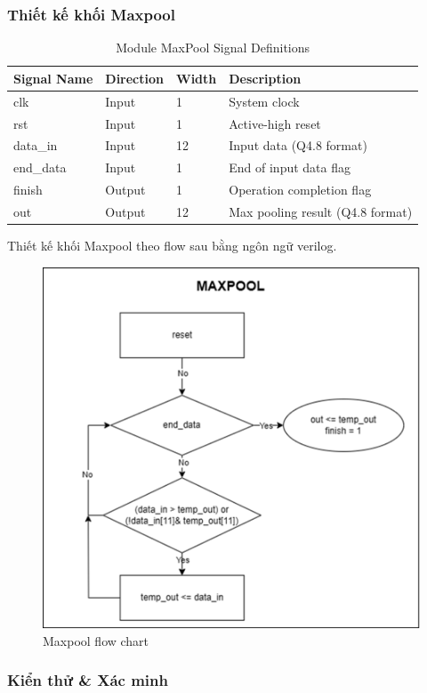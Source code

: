 \subsubsection{Thiết kế khối Maxpool}
\begin{table}[H]
\centering
\caption{Module MaxPool Signal Definitions}
\begin{tabular}{>{\ttfamily}l l l p{6cm}}
\toprule
\textbf{Signal Name} & \textbf{Direction} & \textbf{Width} & \textbf{Description} \\
\midrule
clk      & Input  & 1  & System clock \\
rst      & Input  & 1  & Active-high reset \\
data\_in & Input  & 12 & Input data (Q4.8 format) \\
end\_data & Input & 1  & End of input data flag \\
\midrule
finish   & Output & 1  & Operation completion flag \\
out      & Output & 12 & Max pooling result (Q4.8 format) \\
\bottomrule
\end{tabular}
\end{table}

Thiết kế khối Maxpool theo flow sau bằng ngôn ngữ verilog.
\begin{figure}[H]
    \centering
    \includegraphics[width=0.75\linewidth]{Images/mpflow.png}
    \caption{Maxpool flow chart}
    \label{fig:enter-label}
\end{figure}

\subsubsection{Kiển thử \& Xác minh}

